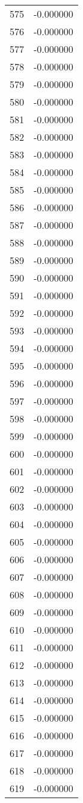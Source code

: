 \documentclass[12pt]{article}
\begin{document}
\begin{longtable}{@{}cc@{}}
575 & -0.000000 \\
576 & -0.000000 \\
577 & -0.000000 \\
578 & -0.000000 \\
579 & -0.000000 \\
580 & -0.000000 \\
581 & -0.000000 \\
582 & -0.000000 \\
583 & -0.000000 \\
584 & -0.000000 \\
585 & -0.000000 \\
586 & -0.000000 \\
587 & -0.000000 \\
588 & -0.000000 \\
589 & -0.000000 \\
590 & -0.000000 \\
591 & -0.000000 \\
592 & -0.000000 \\
593 & -0.000000 \\
594 & -0.000000 \\
595 & -0.000000 \\
596 & -0.000000 \\
597 & -0.000000 \\
598 & -0.000000 \\
599 & -0.000000 \\
600 & -0.000000 \\
601 & -0.000000 \\
602 & -0.000000 \\
603 & -0.000000 \\
604 & -0.000000 \\
605 & -0.000000 \\
606 & -0.000000 \\
607 & -0.000000 \\
608 & -0.000000 \\
609 & -0.000000 \\
610 & -0.000000 \\
611 & -0.000000 \\
612 & -0.000000 \\
613 & -0.000000 \\
614 & -0.000000 \\
615 & -0.000000 \\
616 & -0.000000 \\
617 & -0.000000 \\
618 & -0.000000 \\
619 & -0.000000 \\

\end{longtable}
\end{document}
